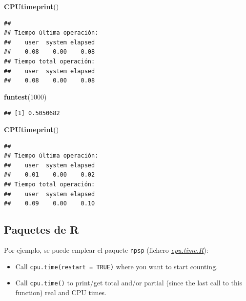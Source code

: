 \documentclass[
]{book}
\newenvironment{Shaded}{\begin{snugshade}}{\end{snugshade}}
\newcommand{\DecValTok}[1]{\textcolor[rgb]{0.00,0.00,0.81}{#1}}
\newcommand{\KeywordTok}[1]{\textcolor[rgb]{0.13,0.29,0.53}{\textbf{#1}}}
\newcommand{\NormalTok}[1]{#1}
\theoremstyle{break}
\theoremstyle{definition}
\theoremstyle{definition}
\theoremstyle{definition}
\theoremstyle{remark}
\begin{document}
\begin{Shaded}
\begin{Highlighting}[]
\KeywordTok{CPUtimeprint}\NormalTok{()}
\end{Highlighting}
\end{Shaded}

\begin{verbatim}
## 
## Tiempo última operación:
##    user  system elapsed 
##    0.08    0.00    0.08 
## Tiempo total operación:
##    user  system elapsed 
##    0.08    0.00    0.08
\end{verbatim}

\begin{Shaded}
\begin{Highlighting}[]
\KeywordTok{funtest}\NormalTok{(}\DecValTok{1000}\NormalTok{)}
\end{Highlighting}
\end{Shaded}

\begin{verbatim}
## [1] 0.5050682
\end{verbatim}

\begin{Shaded}
\begin{Highlighting}[]
\KeywordTok{CPUtimeprint}\NormalTok{()}
\end{Highlighting}
\end{Shaded}

\begin{verbatim}
## 
## Tiempo última operación:
##    user  system elapsed 
##    0.01    0.00    0.02 
## Tiempo total operación:
##    user  system elapsed 
##    0.09    0.00    0.10
\end{verbatim}

\hypertarget{paquetes-de-r-1}{%
\subsection{Paquetes de R}\label{paquetes-de-r-1}}

Por ejemplo, se puede emplear el paquete \texttt{npsp} (fichero \emph{\href{https://github.com/rubenfcasal/npsp/blob/master/R/cpu.time.R}{cpu.time.R}}):

\begin{itemize}
\item
  Call \texttt{cpu.time(restart\ =\ TRUE)} where you want to start counting.
\item
  Call \texttt{cpu.time()} to print/get total and/or partial (since the last call
  to this function) real and CPU times.
\end{itemize}
\end{document}
